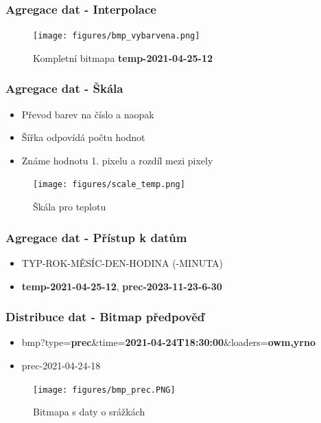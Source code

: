 \documentclass{beamer}
\begin{document}
	\begin{frame}
		\frametitle{Agregace dat - Interpolace}
		
		\begin{figure}
			
			\texttt{[image: figures/bmp\_vybarvena.png]}
			\caption{Kompletní bitmapa \textbf{temp-2021-04-25-12}}
			
		\end{figure}
		
	\end{frame}

	\begin{frame}
		\frametitle{Agregace dat - Škála}
		
		\begin{itemize}
			\item Převod barev na číslo a naopak
			\item Šířka odpovídá počtu hodnot
			\item Známe hodnotu 1. pixelu a rozdíl mezi pixely
		\end{itemize}
		
		\begin{figure}
			
			\texttt{[image: figures/scale\_temp.png]}
			\caption{Škála pro teplotu}
			
		\end{figure}
		
	\end{frame}

	\begin{frame}
		\frametitle{Agregace dat - Přístup k datům}
		
		\begin{itemize}
			\item TYP-ROK-MĚSÍC-DEN-HODINA (-MINUTA)
			\item \textbf{temp-2021-04-25-12}, \textbf{prec-2023-11-23-6-30}
		\end{itemize}
		
	\end{frame}

	\begin{frame}
		\frametitle{Distribuce dat - Bitmap předpověď}
		
		\begin{itemize}			
			\item bmp?type=\textbf{prec}\&time=\textbf{2021-04-24T18:30:00}\&loaders=\textbf{owm,yrno}
			\item prec-2021-04-24-18
		\end{itemize}
		
		\begin{figure}
			
			\texttt{[image: figures/bmp\_prec.PNG]}
			\caption{Bitmapa s daty o srážkách}
			
		\end{figure}
		
	\end{frame}
	
\end{document}
